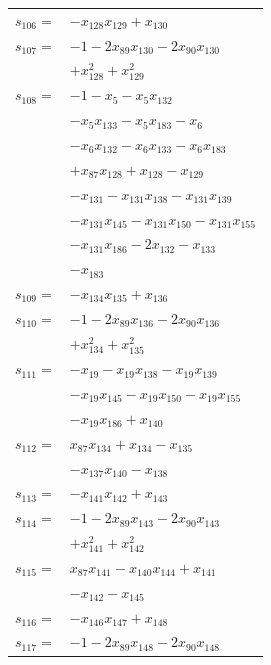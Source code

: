 \begin{longtable}{@{}r@{\;}l@{}}
\(s_{106}=\) & \(\displaystyle -x_{128}x_{129} +x_{130}\) \\[3pt]
\(s_{107}=\) & \(\displaystyle -1 -2x_{89}x_{130} -2x_{90}x_{130}\) \\
 & \(\displaystyle +x_{128}^{2} +x_{129}^{2}\) \\[3pt]
\(s_{108}=\) & \(\displaystyle -1 -x_{5} -x_{5}x_{132}\) \\
 & \(\displaystyle -x_{5}x_{133} -x_{5}x_{183} -x_{6}\) \\
 & \(\displaystyle -x_{6}x_{132} -x_{6}x_{133} -x_{6}x_{183}\) \\
 & \(\displaystyle +x_{87}x_{128} +x_{128} -x_{129}\) \\
 & \(\displaystyle -x_{131} -x_{131}x_{138} -x_{131}x_{139}\) \\
 & \(\displaystyle -x_{131}x_{145} -x_{131}x_{150} -x_{131}x_{155}\) \\
 & \(\displaystyle -x_{131}x_{186} -2x_{132} -x_{133}\) \\
 & \(\displaystyle -x_{183}\) \\[3pt]
\(s_{109}=\) & \(\displaystyle -x_{134}x_{135} +x_{136}\) \\[3pt]
\(s_{110}=\) & \(\displaystyle -1 -2x_{89}x_{136} -2x_{90}x_{136}\) \\
 & \(\displaystyle +x_{134}^{2} +x_{135}^{2}\) \\[3pt]
\(s_{111}=\) & \(\displaystyle -x_{19} -x_{19}x_{138} -x_{19}x_{139}\) \\
 & \(\displaystyle -x_{19}x_{145} -x_{19}x_{150} -x_{19}x_{155}\) \\
 & \(\displaystyle -x_{19}x_{186} +x_{140}\) \\[3pt]
\(s_{112}=\) & \(\displaystyle x_{87}x_{134} +x_{134} -x_{135}\) \\
 & \(\displaystyle -x_{137}x_{140} -x_{138}\) \\[3pt]
\(s_{113}=\) & \(\displaystyle -x_{141}x_{142} +x_{143}\) \\[3pt]
\(s_{114}=\) & \(\displaystyle -1 -2x_{89}x_{143} -2x_{90}x_{143}\) \\
 & \(\displaystyle +x_{141}^{2} +x_{142}^{2}\) \\[3pt]
\(s_{115}=\) & \(\displaystyle x_{87}x_{141} -x_{140}x_{144} +x_{141}\) \\
 & \(\displaystyle -x_{142} -x_{145}\) \\[3pt]
\(s_{116}=\) & \(\displaystyle -x_{146}x_{147} +x_{148}\) \\[3pt]
\(s_{117}=\) & \(\displaystyle -1 -2x_{89}x_{148} -2x_{90}x_{148}\) \\

\end{longtable}
